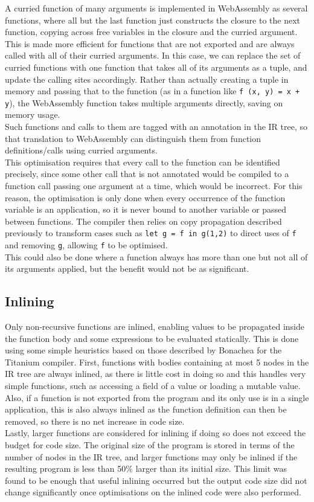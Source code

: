 A curried function of many arguments is implemented in WebAssembly as several functions, where all but the last function just constructs the closure to the next function, copying across free variables in the closure and the curried argument. \\
This is made more efficient for functions that are not exported and are always called with all of their curried arguments.  In this case, we can replace the set of curried functions with one function that takes all of its arguments as a tuple, and update the calling sites accordingly. Rather than actually creating a tuple in memory and passing that to the function (as in a function like \verb|f (x, y) = x + y|), the WebAssembly function takes multiple arguments directly, saving on memory usage. \\
Such functions and calls to them are tagged with an annotation in the IR tree, so that translation to WebAssembly can distinguish them from function definitions/calls using curried arguments. \\
This optimisation requires that every call to the function can be identified precisely, since some other call that is not annotated would be compiled to a function call passing one argument at a time, which would be incorrect. For this reason, the optimisation is only done when every occurrence of the function variable is an application, so it is never bound to another variable or passed between functions. The compiler then relies on copy propagation described previously to transform cases such as  \verb|let g = f in g(1,2)| to direct uses of \verb|f| and removing \verb|g|, allowing \verb|f| to be optimised. \\
This could also be done where a function always has more than one but not all of its arguments applied, but the benefit would not be as significant.


\subsection{Inlining}
Only non-recursive functions are inlined, enabling values to be propagated inside the function body and some expressions to be evaluated statically. This is done using some simple heuristics based on those described by Bonachea for the Titanium compiler\nocite{titanium}. First, functions with bodies containing at most 5 nodes in the IR tree are always inlined, as there is little cost in doing so and this handles very simple functions, such as accessing a field of a value or loading a mutable value. Also, if a function is not exported from the program and its only use is in a single application, this is also always inlined as the function definition can then be removed, so there is no net increase in code size.\\
 Lastly, larger functions are considered for inlining if doing so does not exceed the budget for code size. The original size of the program is stored in terms of the number of nodes in the IR tree, and larger functions may only be inlined if the resulting program is less than 50\% larger than its initial size. This limit was found to be enough that useful inlining occurred but the output code size did not change significantly once optimisations on the inlined code were also performed.

